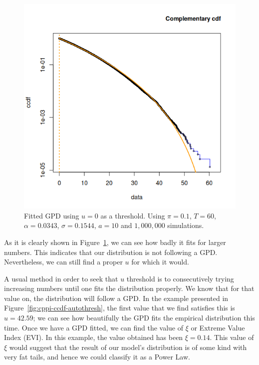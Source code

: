 \begin{figure}[h]
    \centering
    \includegraphics[scale=0.75]{images/cppi-ccdf-0.png}
    \caption{Fitted GPD using $u = 0 $ as a threshold. Using $\pi = 0.1$, $T=60$, $\alpha = 0.0343$, $\sigma = 0.1544$, $a=10$ and $1,000,000$ simulations.}
    \label{fig:cppi-ccdf-0}
\end{figure}

As it is clearly shown in Figure~\ref{fig:cppi-ccdf-0}, we can see how badly it fits for larger numbers. This indicates that our distribution is not following a GPD. Nevertheless, we can still find a proper $u$ for which it would.

A usual method in order to seek that $u$ threshold is to consecutively trying increasing numbers until one fits the distribution properly. We know that for that value on, the distribution will follow a GPD. In the example presented in Figure~\ref{fig:cppi-ccdf-autothresh}, the first value that we find satisfies this is $u = 42.59$; we can see how beautifully the GPD fits the empirical distribution this time. Once we have a GPD fitted, we can find the value of $\xi$ or Extreme Value Index (EVI). In this example, the value obtained has been $\xi = 0.14$. This value of $\xi$ would suggest that the result of our model's distribution is of some kind with very fat tails, and hence we could classify it as a Power Law.

